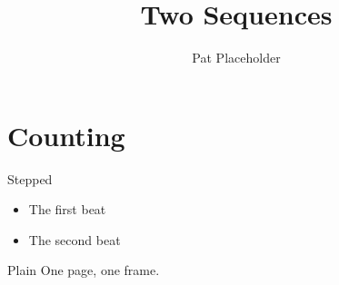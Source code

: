 \documentclass[aspectratio=169]{beamer}
\title{Two Sequences}
\author{Pat Placeholder}
\begin{document}
\maketitle

\section{Counting}


\begin{frame}{Stepped}
  \begin{itemize}
  \item<1-> The first beat
  \item<2-> The second beat
  \end{itemize}
\end{frame}

\begin{frame}{Plain}
  One page, one frame.
\end{frame}
\end{document}
